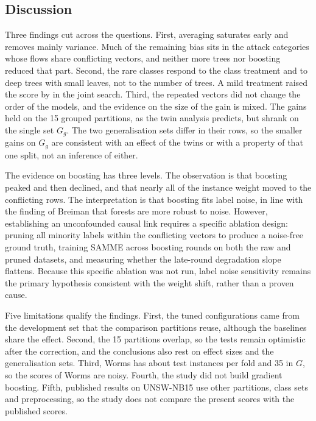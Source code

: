 \documentclass[10pt,conference]{IEEEtran}
\begin{document}
\subsection{Discussion}
\label{sec:res-discussion}

Three findings cut across the questions. First, averaging saturates early and removes mainly variance. Much of the remaining bias sits in the attack categories whose flows share conflicting vectors, and neither more trees nor boosting reduced that part. Second, the rare classes respond to the class treatment and to deep trees with small leaves, not to the number of trees. A mild treatment raised the score by \OJPlainGap{} in the joint search. Third, the repeated vectors did not change the order of the models, and the evidence on the size of the gain is mixed. The gains held on the 15 grouped partitions, as the twin analysis predicts, but shrank on the single set $G_{g}$. The two generalisation sets differ in their rows, so the smaller gains on $G_{g}$ are consistent with an effect of the twins or with a property of that one split, not an inference of either.

The evidence on boosting has three levels. The observation is that boosting peaked and then declined, and that nearly all of the instance weight moved to the conflicting rows. The interpretation is that boosting fits label noise, in line with the finding of Breiman that forests are more robust to noise. However, establishing an unconfounded causal link requires a specific ablation design: pruning all minority labels within the conflicting vectors to produce a noise-free ground truth, training SAMME across boosting rounds on both the raw and pruned datasets, and measuring whether the late-round degradation slope flattens. Because this specific ablation was not run, label noise sensitivity remains the primary hypothesis consistent with the weight shift, rather than a proven cause.

Five limitations qualify the findings. First, the tuned configurations came from the development set that the comparison partitions reuse, although the baselines share the effect. Second, the 15 partitions overlap, so the tests remain optimistic after the correction, and the conclusions also rest on effect sizes and the generalisation sets. Third, Worms has about \nWormsFold{} test instances per fold and 35 in $G$, so the scores of Worms are noisy. Fourth, the study did not build gradient boosting. Fifth, published results on UNSW-NB15 use other partitions, class sets and preprocessing, so the study does not compare the present scores with the published scores.
\end{document}
